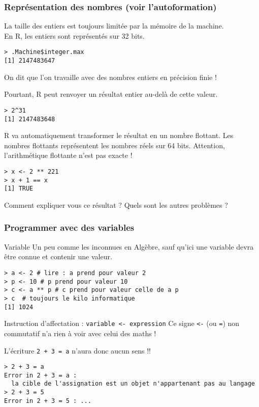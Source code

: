 \documentclass[10pt]{beamer}
\begin{document}
\begin{frame}[fragile]
  \frametitle{Représentation des nombres (voir l'autoformation)}
  \alert{La taille} des entiers \alert{est toujours limitée par} la mémoire de \alert{la machine}. \\
  En R, les entiers sont représentés sur 32 bits.
\begin{lstlisting}
> .Machine$integer.max
[1] 2147483647
\end{lstlisting}
On dit que l'on travaille avec des nombres entiers en \alert{précision finie} !

Pourtant, R peut renvoyer un résultat entier au-delà de cette valeur.
\begin{lstlisting}
> 2^31
[1] 2147483648
\end{lstlisting}
R va automatiquement transformer le résultat en un \alert{nombre flottant}.
Les nombres flottants représentent les nombres réels sur 64 bits.
Attention, l’arithmétique flottante n’est pas exacte !
\begin{lstlisting}
> x <- 2 ** 221
> x + 1 == x
[1] TRUE  
\end{lstlisting}
 Comment expliquer vous ce résultat ? Quels sont les autres problèmes ?
\end{frame}



\begin{frame}[fragile]
  \frametitle{Programmer avec des variables}
  \begin{alertblock}{Variable}
    Un peu comme les \alert{inconnues} en Algèbre, sauf qu'ici une variable devra être \alert{connue} et contenir une valeur.
  \end{alertblock}
      \begin{lstlisting}
> a <- 2 # lire : a prend pour valeur 2
> p <- 10 # p prend pour valeur 10
> c <- a ** p # c prend pour valeur celle de a p
> c  # toujours le kilo informatique
[1] 1024 
\end{lstlisting}

\begin{alertblock}{Instruction d'affectation : \texttt{variable <- expression}}
  Ce signe \texttt{<-} (ou \texttt{=}) non commutatif n'a rien à voir avec celui des maths !
\end{alertblock}

\begin{exampleblock}{  L'écriture \texttt{2 + 3 = a} n'aura donc aucun sens !!}
\begin{lstlisting}[style=block]
> 2 + 3 = a
Error in 2 + 3 = a : 
  la cible de l'assignation est un objet n'appartenant pas au langage
> 2 + 3 = 5
Error in 2 + 3 = 5 : ...
\end{lstlisting}
\end{exampleblock}
\end{frame}
\end{document}
